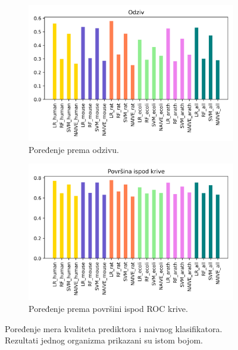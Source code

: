 \begin{figure}[H]
	\begin{subfigure}{0.5\textwidth}
		\centering
		\includegraphics[width=\textwidth]{Figures/rec_poredjenje.png}
		\caption{Poređenje prema odzivu.}
		\label{fig:recscores}
	\end{subfigure}
	\begin{subfigure}{0.5\textwidth}
		\centering
		\includegraphics[width=\textwidth]{Figures/auc_poredjenje.png}
		\caption{Poređenje prema površini ispod ROC krive.}
		\label{fig:aucscores}
	\end{subfigure}
	\caption{Poređenje mera kvaliteta prediktora i naivnog klasifikatora. Rezultati jednog organizma prikazani su istom bojom.}
	\label{fig:eval}
\end{figure}

